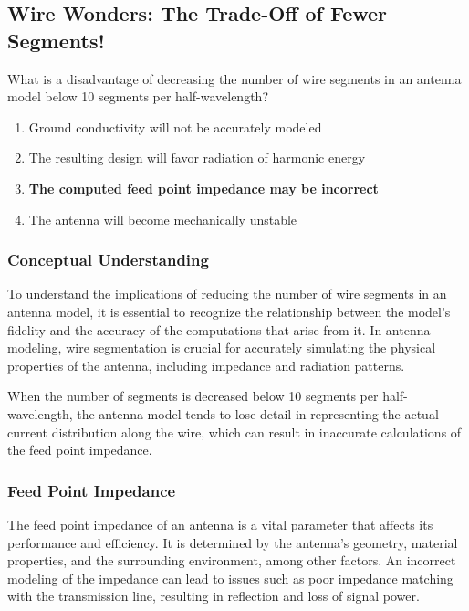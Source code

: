 \subsection{Wire Wonders: The Trade-Off of Fewer Segments!}

\begin{tcolorbox}[colback=gray!10, colframe=black, title=E9B11] 

What is a disadvantage of decreasing the number of wire segments in an antenna model below 10 segments per half-wavelength? 

\begin{enumerate}[label=\Alph*.]
    \item Ground conductivity will not be accurately modeled
    \item The resulting design will favor radiation of harmonic energy
    \item \textbf{The computed feed point impedance may be incorrect}
    \item The antenna will become mechanically unstable
\end{enumerate} \end{tcolorbox}

\subsubsection{Conceptual Understanding}

To understand the implications of reducing the number of wire segments in an antenna model, it is essential to recognize the relationship between the model's fidelity and the accuracy of the computations that arise from it. In antenna modeling, wire segmentation is crucial for accurately simulating the physical properties of the antenna, including impedance and radiation patterns.

When the number of segments is decreased below 10 segments per half-wavelength, the antenna model tends to lose detail in representing the actual current distribution along the wire, which can result in inaccurate calculations of the feed point impedance.

\subsubsection{Feed Point Impedance}

The feed point impedance of an antenna is a vital parameter that affects its performance and efficiency. It is determined by the antenna's geometry, material properties, and the surrounding environment, among other factors. An incorrect modeling of the impedance can lead to issues such as poor impedance matching with the transmission line, resulting in reflection and loss of signal power.

